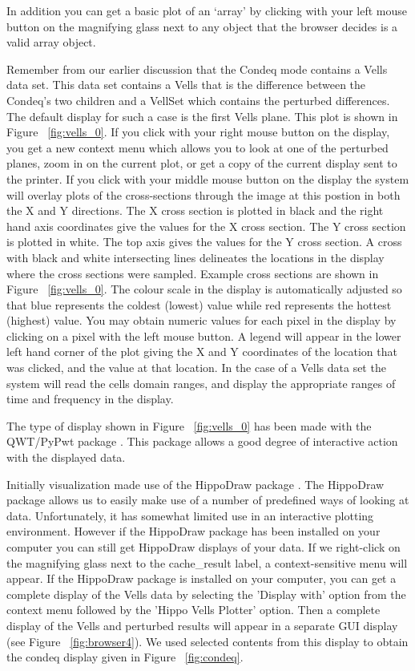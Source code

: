 \documentclass[10pt]{article}
\begin{document}
In addition you can get a basic plot of an `array' by clicking with
your left mouse button on the magnifying glass next to any object that
the browser decides is a valid array object.

Remember from our earlier discussion that the Condeq mode contains
a Vells data set. This data set contains a Vells that is
the difference between the Condeq's two children and a
VellSet which contains the perturbed differences. The default 
display for such a case is the first Vells plane. This plot is
shown in Figure  ~\ref{fig:vells_0}. If you click with your
right mouse button on the display, you get a new context menu
which allows you to look at one of the perturbed planes, zoom
in on the current plot, or get a copy of the current display 
sent to the printer. If you click with your middle mouse button
on the display the system will overlay plots of the cross-sections
through the image at this postion in both the X and Y directions. 
The X cross section is plotted in black and the right hand axis
coordinates give the values for the X cross section. The Y cross
section is plotted in white. The top axis gives the values for the
Y cross section. A cross with black and white intersecting
lines delineates the locations in the display where the cross
sections were sampled. Example cross sections are shown in 
Figure  ~\ref{fig:vells_0}. The colour scale in the display is
automatically adjusted so that blue represents the coldest (lowest)
value while red represents the hottest (highest) value. You may
obtain numeric values for each pixel in the display by clicking
on a pixel with the left mouse button. A legend will appear
in the lower left hand corner of the plot giving the X and Y
coordinates of the location that was clicked, and the value at that
location.  In the case of a Vells data set
the system will read the cells domain ranges, and display the
appropriate ranges of time and frequency in the display.

The type of display shown in Figure  ~\ref{fig:vells_0} 
has been made with the QWT/PyPwt package  \cite{rathmann}.
This package allows a good degree of interactive action with the
displayed data.

Initially visualization made use of the HippoDraw package \cite{kunz}.
The HippoDraw package allows us to easily make use of a number
of predefined ways of looking at data. Unfortunately, it has
somewhat limited use in an interactive plotting environment. However
if the HippoDraw package has been installed on your computer
you can still get HippoDraw displays of your data.
If we right-click on the magnifying glass next to
the cache\_result label, a context-sensitive menu will appear.
If the HippoDraw package is installed on your computer, you can get
a complete display of the Vells data by 
selecting the 'Display with' option from the context menu followed by the
'Hippo Vells Plotter' option. Then a complete display of 
the Vells and perturbed results will appear in a separate GUI
display (see Figure ~\ref{fig:browser4}). We used selected contents
from this display to obtain the condeq display given in 
Figure  ~\ref{fig:condeq}.
\end{document}
